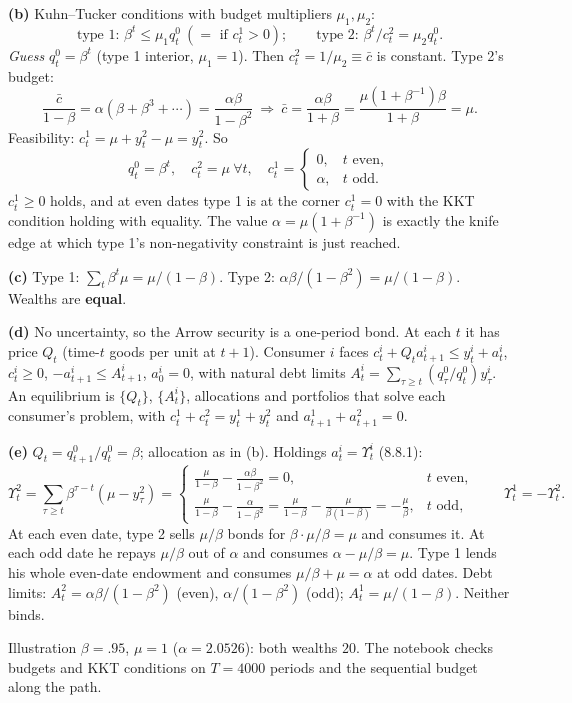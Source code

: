 \documentclass[12pt, letterpaper]{article}
\begin{document}
\begin{tcolorbox}[oddbox,title={Exercise 8.9 \quad A competitive equilibrium}]
\textbf{(b)} Kuhn--Tucker conditions with budget multipliers $\mu_1,\mu_2$:
\[
\text{type 1: }\beta^t\le\mu_1q^0_t\ (=\text{ if }c^1_t>0);\qquad\text{type 2: }\beta^t/c^2_t=\mu_2q^0_t .
\]
\emph{Guess} $q^0_t=\beta^t$ (type 1 interior, $\mu_1=1$). Then $c^2_t=1/\mu_2\equiv\bar c$ is constant. Type 2's budget:
\[
\frac{\bar c}{1-\beta}=\alpha(\beta+\beta^3+\cdots)=\frac{\alpha\beta}{1-\beta^2}\ \Longrightarrow\
\bar c=\frac{\alpha\beta}{1+\beta}=\frac{\mu(1+\beta^{-1})\beta}{1+\beta}=\mu .
\]
Feasibility: $c^1_t=\mu+y^2_t-\mu=y^2_t$. So
\[
\boxed{q^0_t=\beta^t,\quad c^2_t=\mu\ \forall t,\quad c^1_t=\begin{cases}0,&t\text{ even},\\\alpha,&t\text{ odd}.\end{cases}}
\]
$c^1_t\ge0$ holds, and at even dates type 1 is at the corner $c^1_t=0$ with the KKT condition holding with
equality. The value $\alpha=\mu(1+\beta^{-1})$ is exactly the knife edge at which type 1's non-negativity
constraint is just reached.

\textbf{(c)} Type 1: $\sum_t\beta^t\mu=\mu/(1-\beta)$. Type 2: $\alpha\beta/(1-\beta^2)=\mu/(1-\beta)$. Wealths are
\textbf{equal}.

\textbf{(d)} No uncertainty, so the Arrow security is a one-period bond. At each $t$ it has price $Q_t$ (time-$t$ goods
per unit at $t+1$). Consumer $i$ faces $c^i_t+Q_ta^i_{t+1}\le y^i_t+a^i_t$, $c^i_t\ge0$,
$-a^i_{t+1}\le A^i_{t+1}$, $a^i_0=0$, with natural debt limits
$A^i_t=\sum_{\tau\ge t}(q^0_\tau/q^0_t)y^i_\tau$. An equilibrium is $\{Q_t\}$, $\{A^i_t\}$, allocations and
portfolios that solve each consumer's problem, with $c^1_t+c^2_t=y^1_t+y^2_t$ and $a^1_{t+1}+a^2_{t+1}=0$.

\textbf{(e)} $Q_t=q^0_{t+1}/q^0_t=\beta$; allocation as in (b). Holdings $a^i_t=\Upsilon^i_t$ (8.8.1):
\[
\Upsilon^2_t=\sum_{\tau\ge t}\beta^{\tau-t}(\mu-y^2_\tau)=\begin{cases}\frac{\mu}{1-\beta}-\frac{\alpha\beta}{1-\beta^2}=0,&t\text{ even},\\[3pt]
\frac{\mu}{1-\beta}-\frac{\alpha}{1-\beta^2}=\frac{\mu}{1-\beta}-\frac{\mu}{\beta(1-\beta)}=-\frac{\mu}{\beta},&t\text{ odd},\end{cases}
\qquad\Upsilon^1_t=-\Upsilon^2_t .
\]
At each even date, type 2 sells $\mu/\beta$ bonds for $\beta\cdot\mu/\beta=\mu$ and consumes it. At each odd date
he repays $\mu/\beta$ out of $\alpha$ and consumes $\alpha-\mu/\beta=\mu$. Type 1 lends his whole even-date endowment and
consumes $\mu/\beta+\mu=\alpha$ at odd dates. Debt limits: $A^2_t=\alpha\beta/(1-\beta^2)$ (even), $\alpha/(1-\beta^2)$
(odd); $A^1_t=\mu/(1-\beta)$. Neither binds.

\begin{tcolorbox}[databox]
Illustration $\beta=.95$, $\mu=1$ ($\alpha=2.0526$): both wealths $20$. The notebook checks budgets and KKT
conditions on $T=4000$ periods and the sequential budget along the path.
\end{tcolorbox}
\end{tcolorbox}
\end{document}
